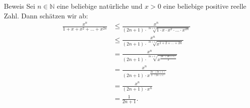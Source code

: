 \documentclass[10pt]{beamer}
\def\bN{\mathbb{N}}
\begin{document}
\begin{frame}{Beweis}
    Sei \( n \in \bN \) eine beliebige natürliche und \( x > 0 \) eine beliebige positive reelle Zahl. Dann schätzen wir ab:
    \begin{align*}
        \frac{x^{n}}{1 + x + x^{2} + \ldots + x^{2n}}
        & \leq \frac{x^{n}}{\left( 2n + 1 \right) \cdot \sqrt[2n + 1]{1 \cdot x \cdot x^{2} \cdot \ldots \cdot x^{2n}}} \\
        & \leq \frac{x^{n}}{\left( 2n + 1 \right) \cdot \sqrt[2n + 1]{x^{1 + 2 + \ldots + 2n}}} \\ 
        & = \frac{x^{n}}{\left( 2n + 1 \right) \cdot \sqrt[2n + 1]{x^{\frac{2n \cdot \left( 2n + 1 \right)}{2}}}} \\
        & = \frac{x^{n}}{\left( 2n + 1 \right) \cdot x^{\frac{2n \cdot \left( 2n + 1 \right)}{2 \cdot \left( 2n + 1 \right)}}} \\
        & = \frac{x^{n}}{\left( 2n + 1 \right) \cdot x^{n}} \\
        & = \frac{1}{2n + 1}.
    \end{align*}
\end{frame}
\end{document}

